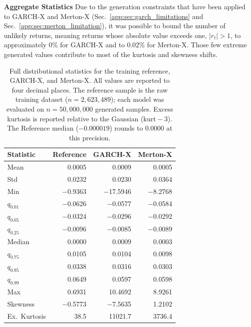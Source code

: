\textbf{Aggregate Statistics} \quad
Due to the generation constraints that have been applied to GARCH-X and Merton-X (Sec.\ \ref{app:sec:garch_limitations} and Sec.\ \ref{app:sec:merton_limitation}), it was possible to bound the number of unlikely returns, meaning returns whose absolute value exceeds one, \(|r_t|>1\), to approximately 0\% for GARCH-X and to 0.02\% for Merton-X. Those few extreme generated values contribute to most of the kurtosis and skewness shifts.
\begin{table}[htbp]
\centering
\footnotesize
\renewcommand{\arraystretch}{1.28}
\setlength{\tabcolsep}{6pt}
\begin{tabular}{l r r r}
\toprule
\textbf{Statistic} & \textbf{Reference} & \textbf{GARCH-X} & \textbf{Merton-X} \\
\midrule
Mean             &        0.0005 &        0.0009 &        0.0005 \\
Std              &        0.0232 &        0.0230 &        0.0364 \\
Min              &  $-$0.9363   &  $-$17.5946  &   $-$8.2768  \\
$q_{0.01}$       &  $-$0.0626   &  $-$0.0577   &   $-$0.0584  \\
$q_{0.05}$       &  $-$0.0324   &  $-$0.0296   &   $-$0.0292  \\
$q_{0.25}$       &  $-$0.0096   &  $-$0.0085   &   $-$0.0089  \\
Median           &        0.0000 &        0.0009 &        0.0003 \\
$q_{0.75}$       &        0.0105 &        0.0104 &        0.0098 \\
$q_{0.95}$       &        0.0338 &        0.0316 &        0.0303 \\
$q_{0.99}$       &        0.0649 &        0.0597 &        0.0598 \\
Max              &        0.6931 &       10.4692 &        8.9261 \\
Skewness         &  $-$0.5773   &  $-$7.5635   &        1.2102 \\
Ex.\ Kurtosis    &       38.5 &  11021.7   &    3736.4  \\
\bottomrule
\end{tabular}
\caption{Full distributional statistics for the training reference, GARCH-X, and
Merton-X. All values are reported to four decimal places. The reference sample is the
raw training dataset ($n = 2{,}623{,}489$); each model was evaluated on
$n = 50{,}000{,}000$ generated samples. Excess kurtosis is reported relative to the
Gaussian ($\text{kurt} - 3$). The Reference median ($-0.000019$) rounds to $0.0000$
at this precision.}
\label{tab:baseline_full}
\end{table}

